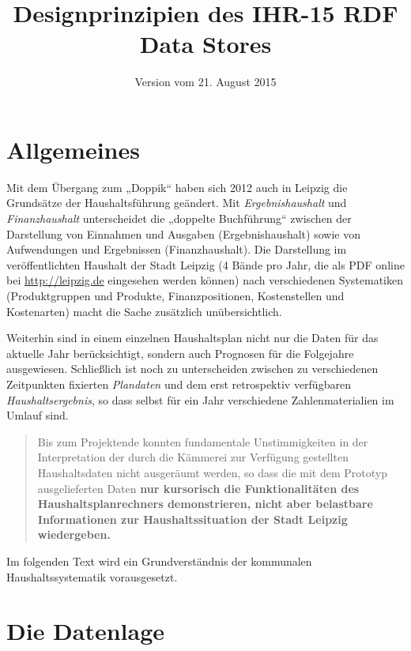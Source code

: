\documentclass[a4paper,11pt,twoside]{article}
\title{Designprinzipien des IHR-15 RDF Data Stores}
\date{Version vom 21. August 2015}
\begin{document}
\maketitle
\tableofcontents
\thispagestyle{empty}
\newpage
\seitezwei
\newpage

\section{Allgemeines}

Mit dem Übergang zum „Doppik“ haben sich 2012 auch in Leipzig die Grundsätze
der Haushaltsführung geändert.  Mit \emph{Ergebnishaushalt} und
\emph{Finanzhaushalt} unterscheidet die „doppelte Buchführung“ zwischen der
Darstellung von Einnahmen und Ausgaben (Ergebnishaushalt) sowie von
Aufwendungen und Ergebnissen (Finanzhaushalt).  Die Darstellung im
veröffentlichten Haushalt der Stadt Leipzig (4 Bände pro Jahr, die als PDF
online bei \url{http://leipzig.de} eingesehen werden können) nach
verschiedenen Systematiken (Produktgruppen und Produkte, Finanzpositionen,
Kostenstellen und Kostenarten) macht die Sache zusätzlich unübersichtlich.

Weiterhin sind in einem einzelnen Haushaltsplan nicht nur die Daten für das
aktuelle Jahr berücksichtigt, sondern auch Prognosen für die Folgejahre
ausgewiesen.  Schließlich ist noch zu unterscheiden zwischen zu verschiedenen
Zeitpunkten fixierten \emph{Plandaten} und dem erst retrospektiv verfügbaren
\emph{Haushaltsergebnis}, so dass selbst für ein Jahr verschiedene
Zahlenmaterialien im Umlauf sind.

\begin{quote}
  Bis zum Projektende konnten fundamentale Unstimmigkeiten in der
  Interpretation der durch die Kämmerei zur Verfügung gestellten Haushaltsdaten
  nicht ausgeräumt werden, so dass die mit dem Prototyp ausgelieferten Daten
  \textbf{nur kursorisch die Funktionalitäten des Haushaltsplanrechners
    demonstrieren, nicht aber belastbare Informationen zur Haushaltssituation
    der Stadt Leipzig wiedergeben.} 
\end{quote}


Im folgenden Text wird ein Grundverständnis der kommunalen Haushaltssystematik
vorausgesetzt.

\section{Die Datenlage}
\end{document}
